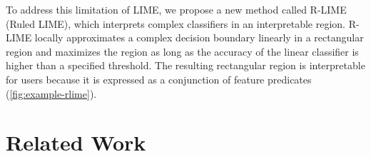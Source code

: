 \documentclass[runningheads]{llncs}
\begin{document}
To address this limitation of LIME,
we propose a new method called R-LIME (Ruled LIME),
which interprets complex classifiers in an interpretable region.
R-LIME locally approximates a complex decision boundary linearly
in a rectangular region and maximizes the region
as long as the accuracy of the linear classifier is
higher than a specified threshold.
The resulting rectangular region is interpretable for users because it is
expressed as a conjunction of feature predicates (\cref{fig:example-rlime}).

\section{Related Work}
\end{document}
